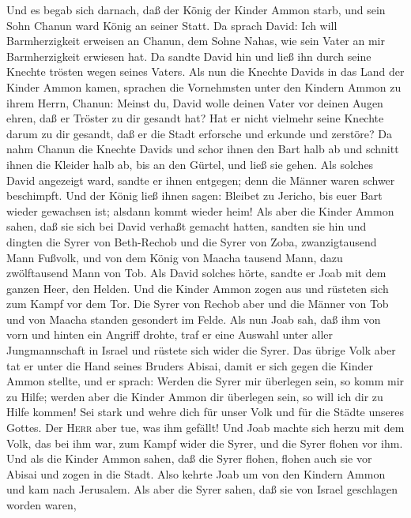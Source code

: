  Und es begab sich darnach, daß der König der Kinder Ammon
starb, und sein Sohn Chanun ward König an seiner Statt. 
Da sprach David: Ich will Barmherzigkeit erweisen an Chanun, dem Sohne
Nahas, wie sein Vater an mir Barmherzigkeit erwiesen hat. Da sandte
David hin und ließ ihn durch seine Knechte trösten wegen seines Vaters.
Als nun die Knechte Davids in das Land der Kinder Ammon kamen,
 sprachen die Vornehmsten unter den Kindern Ammon zu ihrem
Herrn, Chanun: Meinst du, David wolle deinen Vater vor deinen Augen
ehren, daß er Tröster zu dir gesandt hat? Hat er nicht vielmehr seine
Knechte darum zu dir gesandt, daß er die Stadt erforsche und erkunde und
zerstöre?  Da nahm Chanun die Knechte Davids und schor
ihnen den Bart halb ab und schnitt ihnen die Kleider halb ab, bis an den
Gürtel, und ließ sie gehen.  Als solches David angezeigt
ward, sandte er ihnen entgegen; denn die Männer waren schwer beschimpft.
Und der König ließ ihnen sagen: Bleibet zu Jericho, bis euer Bart wieder
gewachsen ist; alsdann kommt wieder heim!  Als aber die
Kinder Ammon sahen, daß sie sich bei David verhaßt gemacht hatten,
sandten sie hin und dingten die Syrer von Beth-Rechob und die Syrer von
Zoba, zwanzigtausend Mann Fußvolk, und von dem König von Maacha tausend
Mann, dazu zwölftausend Mann von Tob.  Als David solches
hörte, sandte er Joab mit dem ganzen Heer, den Helden. 
Und die Kinder Ammon zogen aus und rüsteten sich zum Kampf vor dem Tor.
Die Syrer von Rechob aber und die Männer von Tob und von Maacha standen
gesondert im Felde.  Als nun Joab sah, daß ihm von vorn
und hinten ein Angriff drohte, traf er eine Auswahl unter aller
Jungmannschaft in Israel und rüstete sich wider die Syrer.
 Das übrige Volk aber tat er unter die Hand seines
Bruders Abisai, damit er sich gegen die Kinder Ammon stellte,
 und er sprach: Werden die Syrer mir überlegen sein, so
komm mir zu Hilfe; werden aber die Kinder Ammon dir überlegen sein, so
will ich dir zu Hilfe kommen!  Sei stark und wehre dich
für unser Volk und für die Städte unseres Gottes. Der \textsc{Herr} aber
tue, was ihm gefällt!  Und Joab machte sich herzu mit dem
Volk, das bei ihm war, zum Kampf wider die Syrer, und die Syrer flohen
vor ihm.  Und als die Kinder Ammon sahen, daß die Syrer
flohen, flohen auch sie vor Abisai und zogen in die Stadt. Also kehrte
Joab um von den Kindern Ammon und kam nach Jerusalem. 
Als aber die Syrer sahen, daß sie von Israel geschlagen worden waren,
